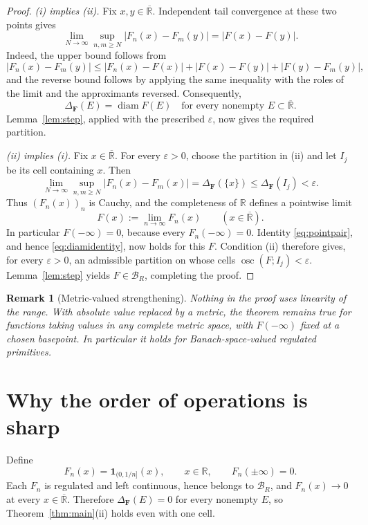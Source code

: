 \documentclass[11pt]{article}
\newtheorem{remark}[theorem]{Remark}
\newcommand{\R}{\mathbb R}
\newcommand{\Rbar}{\overline{\mathbb R}}
\newcommand{\BR}{\mathcal B_R}
\newcommand{\diam}{\operatorname{diam}}
\newcommand{\osc}{\operatorname{osc}}
\begin{document}
\begin{proof}
\emph{(i) implies (ii).}
Fix \(x,y\in\Rbar\).  Independent tail convergence at these two points gives
\begin{equation}\label{eq:pointpair}
 \lim_{N\to\infty}\sup_{n,m\geq N}|F_n(x)-F_m(y)|
 =|F(x)-F(y)|.
\end{equation}
Indeed, the upper bound follows from
\[
 |F_n(x)-F_m(y)|
 \leq |F_n(x)-F(x)|+|F(x)-F(y)|+|F(y)-F_m(y)|,
\]
and the reverse bound follows by applying the same inequality with the
roles of the limit and the approximants reversed.
Consequently,
\begin{equation}\label{eq:diamidentity}
 \Delta_{\mathbf F}(E)=\diam F(E)
 \quad\text{for every nonempty }E\subset\Rbar.
\end{equation}
Lemma~\ref{lem:step}, applied with the prescribed \(\varepsilon\), now gives
the required partition.

\smallskip
\noindent
\emph{(ii) implies (i).}
Fix \(x\in\Rbar\).  For every \(\varepsilon>0\), choose the partition in
(ii) and let \(I_j\) be its cell containing \(x\).  Then
\[
 \lim_{N\to\infty}\sup_{n,m\geq N}|F_n(x)-F_m(x)|
 =\Delta_{\mathbf F}(\{x\})
 \leq\Delta_{\mathbf F}(I_j)<\varepsilon.
\]
Thus \((F_n(x))_n\) is Cauchy, and the completeness of \(\R\) defines a
pointwise limit
\[
 F(x):=\lim_{n\to\infty}F_n(x)
 \qquad(x\in\Rbar).
\]
In particular \(F(-\infty)=0\), because every \(F_n(-\infty)=0\).
Identity \eqref{eq:pointpair}, and hence
\eqref{eq:diamidentity}, now holds for this \(F\).
Condition (ii) therefore gives, for every \(\varepsilon>0\), an admissible
partition on whose cells \(\osc(F;I_j)<\varepsilon\).
Lemma~\ref{lem:step} yields \(F\in\BR\), completing the proof.
\end{proof}

\begin{remark}[Metric-valued strengthening]
Nothing in the proof uses linearity of the range.  With absolute value
replaced by a metric, the theorem remains true for functions taking values
in any complete metric space, with \(F(-\infty)\) fixed at a chosen
basepoint.  In particular it holds for Banach-space-valued regulated
primitives.
\end{remark}

\section{Why the order of operations is sharp}

Define
\[
 F_n(x)=\mathbf 1_{(0,1/n]}(x),\qquad x\in\R,
 \qquad F_n(\pm\infty)=0.
\]
Each \(F_n\) is regulated and left continuous, hence belongs to \(\BR\), and
\(F_n(x)\to0\) at every \(x\in\Rbar\).  Therefore
\(\Delta_{\mathbf F}(E)=0\) for every nonempty \(E\), so
Theorem~\ref{thm:main}(ii) holds even with one cell.
\end{document}
